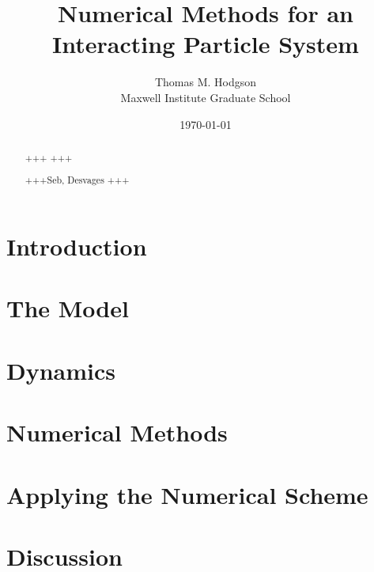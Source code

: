 \documentclass[11pt, a4paper]{article}
\title{{\huge Numerical Methods for an Interacting Particle System}}
\author{Thomas M. Hodgson\\ \vspace{0.5cm} Maxwell Institute Graduate School}
\date{\today}
\newcommand\testname{Acknowledgements}
\newenvironment{acknowledge}
{\renewcommand\abstractname{\testname}\begin{abstract}}
    {\end{abstract}}
\begin{document}
	\maketitle
    \thispagestyle{empty}
	\newpage
	\tableofcontents
	\listoffigures
	\newpage
    \begin{abstract}
        +++ +++
    \end{abstract}
    \begin{acknowledge}
        +++Seb, Desvages +++
    \end{acknowledge}
      \newpage 
	\section{Introduction}\label{sec:introduction}
        
       
	\section{The Model}\label{sec:model}
        
        
	\section{Dynamics}\label{sec:dynamics}
        
        
   	\section{Numerical Methods}\label{sec:numericalmethods}
        
 
    \section{Applying the Numerical Scheme}\label{sec:application}
        
        
    \section{Discussion}\label{sec:discussion}
        

    
    
    \appendix
\end{document}
